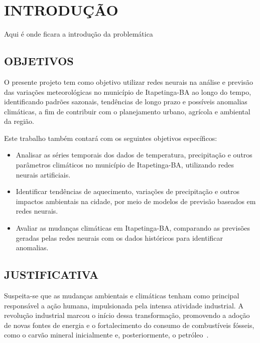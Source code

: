 \chapter{INTRODUÇÃO}

Aqui é onde ficara a introdução da problemática

\section{OBJETIVOS}
    O presente projeto tem como objetivo utilizar redes neurais na análise e previsão das variações meteorológicas no 
    município de Itapetinga-BA ao longo do tempo, identificando padrões sazonais, tendências de longo prazo e 
    possíveis anomalias climáticas, a fim de contribuir com o planejamento urbano, agrícola e ambiental da região.
    
    Este trabalho também contará com os seguintes objetivos específicos:

    \begin{itemize}
        \item Analisar as séries temporais dos dados de temperatura, precipitação e outros 
              parâmetros climáticos no município de Itapetinga-BA, utilizando redes neurais artificiais.
        \item Identificar tendências de aquecimento, variações de precipitação e outros 
              impactos ambientais na cidade, por meio de modelos de previsão baseados em redes neurais.
        \item Avaliar as mudanças climáticas em Itapetinga-BA, comparando as previsões 
              geradas pelas redes neurais com os dados históricos para identificar anomalias.
    \end{itemize}

\section{JUSTIFICATIVA}
    Suspeita-se que as mudanças ambientais e climáticas tenham como principal responsável a ação humana, 
    impulsionada pela intensa atividade industrial. A revolução industrial marcou o início dessa transformação, 
    promovendo a adoção de novas fontes de energia e o fortalecimento do consumo de combustíveis fósseis, como o 
    carvão mineral inicialmente e, posteriormente, o petróleo~\cite{mendoncca2006aquecimento}.
    
